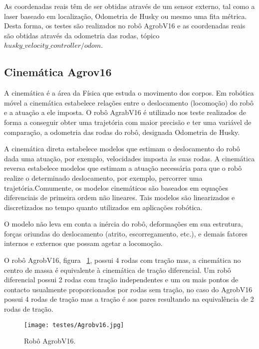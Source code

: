 As coordenadas reais têm de ser obtidas através de um sensor externo, tal como a laser baseado em localização, Odometria de Husky ou mesmo uma fita métrica. Desta forma, os testes são realizados no robô AgrobV16 e as coordenadas reais são obtidas através da odometria das rodas, tópico \textit{$husky\_velocity\_controller/odom$}.

\subsection{Cinemática Agrov16}

A cinemática é a área da Física que estuda o movimento dos corpos. Em robótica móvel a cinemática estabelece relações entre o deslocamento (locomoção) do robô e a atuação a ele imposta. O robô AgrabV16 é utilizado nos teste realizados de forma a conseguir obter uma trajetória com maior precisão e ter uma variável de comparação, a odometria das rodas do robô, designada  Odometria de Husky. 

A cinemática direta estabelece modelos que estimam o deslocamento do robô dada uma atuação, por exemplo, velocidades imposta às suas rodas. A cinemática reversa estabelece modelos que estimam a atuação necessária para que o robô realize o determinado deslocamento, por exemplo, percorrer uma trajetória.Comumente, os modelos cinemáticos são baseados em equações diferenciais de primeira ordem não lineares. Tais modelos são linearizados e discretizados no tempo quanto utilizados em aplicações robótica.


O modelo não leva em conta a inércia do robô, deformações em sua estrutura, forças oriundas do deslocamento (atrito, escorregamento, etc.), e demais fatores internos e externos que possam agetar a locomoção.


O robô AgrobV16, figura ~\ref{fig:agrobv16}, possui 4 rodas com tração mas, a cinemática no centro de massa é equivalente à cinemática de tração diferencial. Um robô diferencial possui 2 rodas com tração independentes e um ou mais pontos de contacto usualmente proporcionados por rodas sem tração, no caso do AgrobV16 possui 4 rodas de tração mas a tração é aos pares resultando na equivalência de 2 rodas de tração.


\begin{figure}[h!] %
	\begin{center}
		\leavevmode		
		\texttt{[image: testes/Agrobv16.jpg]}
		\caption{Robô AgrobV16.}
		\label{fig:agrobv16}
	\end{center}
\end{figure}





